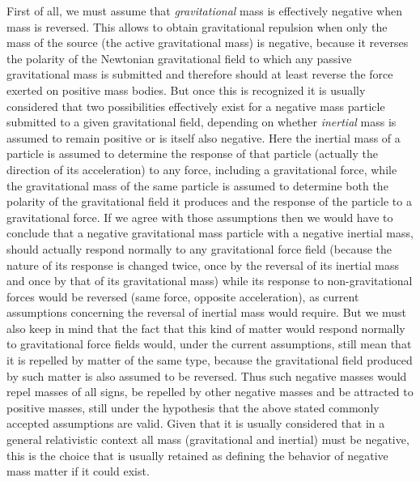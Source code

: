 \documentclass[notitlepage,12pt]{report}
\begin{document}
First of all, we must assume that \textit{gravitational} mass is effectively negative when mass is reversed. This allows to obtain gravitational repulsion when only the mass of the source (the active gravitational mass) is negative, because it reverses the polarity of the Newtonian gravitational field to which any passive gravitational mass is submitted and therefore should at least reverse the force exerted on positive mass bodies. But once this is recognized it is usually considered that two possibilities effectively exist for a negative mass particle submitted to a given gravitational field, depending on whether \textit{inertial} mass is assumed to remain positive or is itself also negative. Here the inertial mass of a particle is assumed to determine the response of that particle (actually the direction of its acceleration) to any force, including a gravitational force, while the gravitational mass of the same particle is assumed to determine both the polarity of the gravitational field it produces and the response of the particle to a gravitational force. If we agree with those assumptions then we would have to conclude that a negative gravitational mass particle with a negative inertial mass, should actually respond normally to any gravitational force field (because the nature of its response is changed twice, once by the reversal of its inertial mass and once by that of its gravitational mass) while its response to non-gravitational forces would be reversed (same force, opposite acceleration), as current assumptions concerning the reversal of inertial mass would require. But we must also keep in mind that the fact that this kind of matter would respond normally to gravitational force fields would, under the current assumptions, still mean that it is repelled by matter of the same type, because the gravitational field produced by such matter is also assumed to be reversed. Thus such negative masses would repel masses of all signs, be repelled by other negative masses and be attracted to positive masses, still under the hypothesis that the above stated commonly accepted assumptions are valid. Given that it is usually considered that in a general relativistic context all mass (gravitational and inertial) must be negative, this is the choice that is usually retained as defining the behavior of negative mass matter if it could exist.
\end{document}
